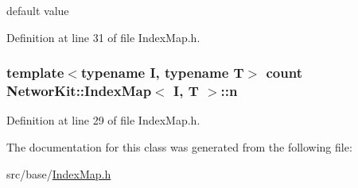 default value 



Definition at line 31 of file Index\-Map.\-h.

\hypertarget{class_networ_kit_1_1_index_map_abffdb945755f2789f33b5eb6e95430d8}{
\subsubsection[{n}]{\setlength{\rightskip}{0pt plus 5cm}template$<$typename I, typename T$>$ {\bf count} {\bf Networ\-Kit\-::\-Index\-Map}$<$ I, T $>$\-::n\hspace{0.3cm}{\ttfamily [protected]}}}\label{class_networ_kit_1_1_index_map_abffdb945755f2789f33b5eb6e95430d8}


Definition at line 29 of file Index\-Map.\-h.



The documentation for this class was generated from the following file\-:\begin{DoxyCompactItemize}
\item 
src/base/\hyperlink{_index_map_8h}{Index\-Map.\-h}\end{DoxyCompactItemize}

